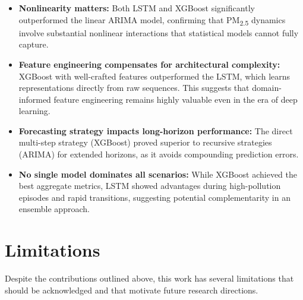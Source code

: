 \begin{itemize}
    \item \textbf{Nonlinearity matters:} Both LSTM and XGBoost significantly outperformed the linear ARIMA model, confirming that PM\textsubscript{2.5} dynamics involve substantial nonlinear interactions that statistical models cannot fully capture.
    \item \textbf{Feature engineering compensates for architectural complexity:} XGBoost with well-crafted features outperformed the LSTM, which learns representations directly from raw sequences. This suggests that domain-informed feature engineering remains highly valuable even in the era of deep learning.
    \item \textbf{Forecasting strategy impacts long-horizon performance:} The direct multi-step strategy (XGBoost) proved superior to recursive strategies (ARIMA) for extended horizons, as it avoids compounding prediction errors.
    \item \textbf{No single model dominates all scenarios:} While XGBoost achieved the best aggregate metrics, LSTM showed advantages during high-pollution episodes and rapid transitions, suggesting potential complementarity in an ensemble approach.
\end{itemize}

\section{Limitations}
\label{sec:sum-limitations}

Despite the contributions outlined above, this work has several limitations that should be acknowledged and that motivate future research directions.

